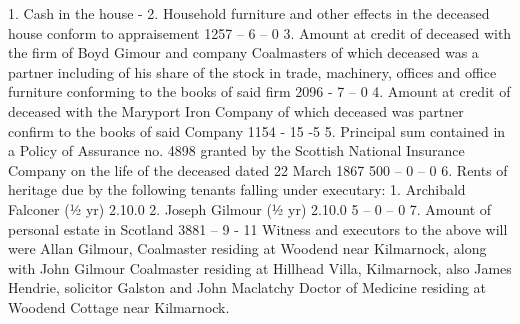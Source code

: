     1. Cash in the house -
    2. Household furniture and other effects in the deceased house
    conform to appraisement 1257 – 6 – 0
    3. Amount at credit of deceased with the firm of Boyd Gimour and
    company Coalmasters of which deceased was a partner including
    of his share of the stock in trade, machinery, offices and office
    furniture conforming to the books of said firm 2096 - 7 – 0
    4. Amount at credit of deceased with the Maryport Iron Company
    of which deceased was partner confirm to the books of said
    Company 1154 - 15 -5
    5. Principal sum contained in a Policy of Assurance no. 4898
    granted by the Scottish National Insurance Company on the life
    of the deceased dated 22 March 1867 500 – 0 – 0
    6. Rents of heritage due by the following tenants falling under
    executary: 1. Archibald Falconer (½ yr) 2.10.0
    2. Joseph Gilmour (½ yr) 2.10.0 5 – 0 – 0
    7. Amount of personal estate in Scotland 3881 – 9 - 11 
    Witness and executors to the above will were Allan Gilmour, Coalmaster residing at Woodend near Kilmarnock, along with John Gilmour Coalmaster residing at Hillhead Villa, Kilmarnock, also James Hendrie, solicitor Galston and John Maclatchy Doctor of Medicine residing at Woodend Cottage near Kilmarnock.



\begin{references}




\end{references}
